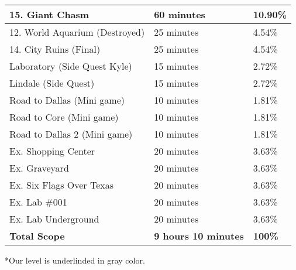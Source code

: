\begin{center}
\begin{tabular}[c]{| p{6cm} | p{4cm} | p{3cm} |}
				\rowcolor{light-light-gray}
						15. Giant Chasm				  & 60 minutes                	& 10.90\%                \\ \hline
				12. World Aquarium (Destroyed)        & 25 minutes             	    & 4.54\%                 \\ \hline
					14. City Ruins (Final)   	   	  & 25 minutes                  & 4.54\%                 \\ \hline
				Laboratory (Side Quest Kyle)		  & 15 minutes					& 2.72\%					  \\ \hline
					Lindale (Side Quest)			  & 15 minutes					& 2.72\%					  \\ \hline
				Road to Dallas (Mini game)			  & 10 minutes					& 1.81\%					  \\ \hline
					Road to Core (Mini game)		  & 10 minutes					& 1.81\%					  \\ \hline
				Road to Dallas 2 (Mini game)		  & 10 minutes					& 1.81\%					  \\ \hline
		             Ex. Shopping Center              & 20 minutes                  & 3.63\%                 \\ \hline
		                Ex. Graveyard                 & 20 minutes                  & 3.63\%                 \\ \hline
		          Ex. Six Flags Over Texas            & 20 minutes                  & 3.63\%                 \\ \hline
		         		 Ex. Lab \#001      	      & 20 minutes                  & 3.63\%                 \\ \hline
		             Ex. Lab Underground              & 20 minutes                  & 3.63\%                 \\ \hline\hline
		            \textbf{Total Scope}              & \textbf{9 hours 10 minutes} & \textbf{100\%}      \\ \hline
	\end{tabular}
\end{center}

*Our level is underlinded in gray color.